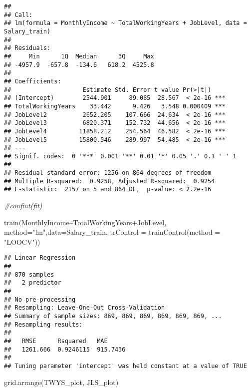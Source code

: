 \documentclass[
]{article}
\newenvironment{Shaded}{\begin{snugshade}}{\end{snugshade}}
\newcommand{\AttributeTok}[1]{\textcolor[rgb]{0.77,0.63,0.00}{#1}}
\newcommand{\CommentTok}[1]{\textcolor[rgb]{0.56,0.35,0.01}{\textit{#1}}}
\newcommand{\FunctionTok}[1]{\textcolor[rgb]{0.00,0.00,0.00}{#1}}
\newcommand{\NormalTok}[1]{#1}
\newcommand{\SpecialCharTok}[1]{\textcolor[rgb]{0.00,0.00,0.00}{#1}}
\newcommand{\StringTok}[1]{\textcolor[rgb]{0.31,0.60,0.02}{#1}}
\begin{document}
\begin{verbatim}
## 
## Call:
## lm(formula = MonthlyIncome ~ TotalWorkingYears + JobLevel, data = Salary_train)
## 
## Residuals:
##     Min      1Q  Median      3Q     Max 
## -4957.9  -657.8  -134.6   618.2  4525.8 
## 
## Coefficients:
##                    Estimate Std. Error t value Pr(>|t|)    
## (Intercept)        2544.901     89.085  28.567  < 2e-16 ***
## TotalWorkingYears    33.442      9.426   3.548 0.000409 ***
## JobLevel2          2652.205    107.666  24.634  < 2e-16 ***
## JobLevel3          6820.371    152.732  44.656  < 2e-16 ***
## JobLevel4         11858.212    254.564  46.582  < 2e-16 ***
## JobLevel5         15800.546    289.997  54.485  < 2e-16 ***
## ---
## Signif. codes:  0 '***' 0.001 '**' 0.01 '*' 0.05 '.' 0.1 ' ' 1
## 
## Residual standard error: 1256 on 864 degrees of freedom
## Multiple R-squared:  0.9258, Adjusted R-squared:  0.9254 
## F-statistic:  2157 on 5 and 864 DF,  p-value: < 2.2e-16
\end{verbatim}

\begin{Shaded}
\begin{Highlighting}[]
\CommentTok{\#confint(fit)}

\FunctionTok{train}\NormalTok{(MonthlyIncome}\SpecialCharTok{\textasciitilde{}}\NormalTok{TotalWorkingYears}\SpecialCharTok{+}\NormalTok{JobLevel, }\AttributeTok{method=}\StringTok{"lm"}\NormalTok{,}\AttributeTok{data=}\NormalTok{Salary\_train, }\AttributeTok{trControl =} \FunctionTok{trainControl}\NormalTok{(}\AttributeTok{method =} \StringTok{"LOOCV"}\NormalTok{))}
\end{Highlighting}
\end{Shaded}

\begin{verbatim}
## Linear Regression 
## 
## 870 samples
##   2 predictor
## 
## No pre-processing
## Resampling: Leave-One-Out Cross-Validation 
## Summary of sample sizes: 869, 869, 869, 869, 869, 869, ... 
## Resampling results:
## 
##   RMSE      Rsquared   MAE     
##   1261.666  0.9246115  915.7436
## 
## Tuning parameter 'intercept' was held constant at a value of TRUE
\end{verbatim}

\begin{Shaded}
\begin{Highlighting}[]
\FunctionTok{grid.arrange}\NormalTok{(TWYS\_plot, JLS\_plot)}
\end{Highlighting}
\end{Shaded}
\end{document}
